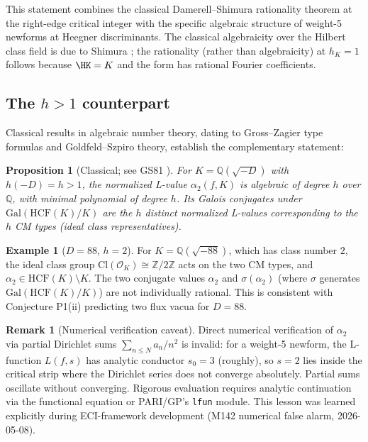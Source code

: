 \documentclass[12pt,a4paper]{article}
\theoremstyle{plain}
\newtheorem{proposition}[theorem]{Proposition}
\theoremstyle{definition}
\newtheorem{example}[theorem]{Example}
\newtheorem{remark}[theorem]{Remark}
\newcommand{\Q}{\mathbb{Q}}
\newcommand{\Z}{\mathbb{Z}}
\newcommand{\OK}{\mathcal{O}_K}
\newcommand{\HCF}{\mathrm{HCF}}
\newcommand{\Gal}{\mathrm{Gal}}
\begin{document}
This statement combines the classical Damerell--Shimura rationality
theorem at the right-edge critical integer with the specific algebraic
structure of weight-5 newforms at Heegner discriminants. The classical
algebraicity over the Hilbert class field is due to Shimura
\cite{Shimura1977}; the rationality (rather than algebraicity) at
$h_K=1$ follows because $\HK = K$ and the form has rational Fourier
coefficients.

\subsection{The $h > 1$ counterpart}

Classical results in algebraic number theory, dating to Gross--Zagier type
formulas and Goldfeld--Szpiro theory, establish the complementary statement:

\begin{proposition}[Classical; see GS81 ]
\label{prop:h>1}
For $K = \Q(\sqrt{-D})$ with $h(-D) = h > 1$, the normalized L-value
$\alpha_2(f, K)$ is algebraic of degree $h$ over $\Q$, with minimal
polynomial of degree $h$. Its Galois conjugates under $\Gal(\HCF(K)/K)$
are the $h$ distinct normalized L-values corresponding to the $h$ CM types
(ideal class representatives).
\end{proposition}

\begin{example}[$D = 88$, $h = 2$]
For $K = \Q(\sqrt{-88})$, which has class number $2$, the ideal class group
$\mathrm{Cl}(\OK) \cong \Z/2\Z$ acts on the two CM types, and
$\alpha_2 \in \HCF(K) \setminus K$. The two conjugate values
$\alpha_2$ and $\sigma(\alpha_2)$ (where $\sigma$ generates
$\Gal(\HCF(K)/K)$) are not individually rational. This is consistent with
Conjecture P1(ii) predicting two flux vacua for $D=88$.
\end{example}

\begin{remark}[Numerical verification caveat]
Direct numerical verification of $\alpha_2$ via partial Dirichlet sums
$\sum_{n \le N} a_n / n^2$ is invalid: for a weight-5 newform, the
L-function $L(f, s)$ has analytic conductor $s_0 = 3$ (roughly), so $s=2$
lies inside the critical strip where the Dirichlet series does not converge
absolutely. Partial sums oscillate without converging. Rigorous evaluation
requires analytic continuation via the functional equation or PARI/GP's
\texttt{lfun} module. This lesson was learned explicitly during ECI-framework
development (M142 numerical false alarm, 2026-05-08).
\end{remark}
\end{document}
